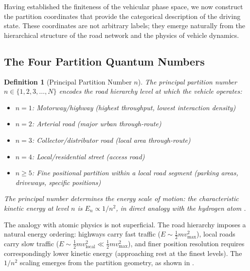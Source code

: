 \documentclass[twocolumn,10pt]{article}
\newtheorem{definition}[theorem]{Definition}
\newcommand{\vmax}{v_{\mathrm{max}}}
\begin{document}
Having established the finiteness of the vehicular phase space, we now construct the partition coordinates that provide the categorical description of the driving state. These coordinates are not arbitrary labels; they emerge naturally from the hierarchical structure of the road network and the physics of vehicle dynamics.

\subsection{The Four Partition Quantum Numbers}

\begin{definition}[Principal Partition Number $n$]\label{def:n}
The principal partition number $n \in \{1, 2, 3, \ldots, N\}$ encodes the road hierarchy level at which the vehicle operates:
\begin{itemize}
    \item $n = 1$: Motorway/highway (highest throughput, lowest interaction density)
    \item $n = 2$: Arterial road (major urban through-route)
    \item $n = 3$: Collector/distributor road (local area through-route)
    \item $n = 4$: Local/residential street (access road)
    \item $n \geq 5$: Fine positional partition within a local road segment (parking areas, driveways, specific positions)
\end{itemize}
The principal number determines the energy scale of motion: the characteristic kinetic energy at level $n$ is $E_n \propto 1/n^2$, in direct analogy with the hydrogen atom \cite{sachikonye2026depth}.
\end{definition}

The analogy with atomic physics is not superficial. The road hierarchy imposes a natural energy ordering: highways carry fast traffic ($E \sim \frac{1}{2}m\vmax^2$), local roads carry slow traffic ($E \sim \frac{1}{2}m v_{\mathrm{local}}^2 \ll \frac{1}{2}m\vmax^2$), and finer position resolution requires correspondingly lower kinetic energy (approaching rest at the finest levels). The $1/n^2$ scaling emerges from the partition geometry, as shown in \cite{sachikonye2026depth}.
\end{document}
